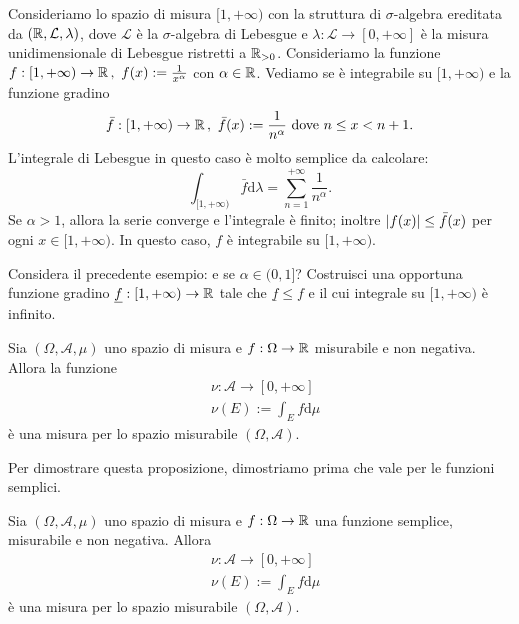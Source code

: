 \begin{esempio}
Consideriamo lo spazio di misura \([1, +\infty)\) con la struttura di \(\sigma\)-algebra ereditata da \((\mathbb R, \mathcal L, \lambda)\), dove \(\mathcal L\) è la \(\sigma\)-algebra di Lebesgue e \(\lambda : \mathcal L \to [0, +\infty]\) è la misura unidimensionale di Lebesgue ristretti a \(\mathbb R_{> 0}\). Consideriamo la funzione
\(f : [1, +\infty) \to \mathbb R \,,\ f(x) := \frac1{x^\alpha}\)
con \(\alpha \in \mathbb R\). Vediamo se è integrabile su \([1, +\infty)\) e la funzione gradino
\[\bar f : [1, +\infty) \to \mathbb R\,,\ \bar f(x) := \frac{1}{n^\alpha} \ \text{dove } n \le x < n+1 .\]
L'integrale di Lebesgue in questo caso è molto semplice da calcolare:
\[\int_{[1, +\infty)} \bar f \mathrm d \lambda = \sum_{n = 1}^{+\infty} \frac{1}{n^\alpha} .\]
Se \(\alpha > 1\), allora la serie converge e l'integrale è finito; inoltre \(\left\lvert f(x)\right\rvert\le \bar f(x)\) per ogni \(x \in [1, +\infty)\). In questo caso, \(f\) è integrabile su \([1, +\infty)\).
\end{esempio}

\begin{esercizio}
Considera il precedente esempio: e se \(\alpha \in (0, 1]\)? Costruisci una opportuna funzione gradino \(\underline f : [1, +\infty) \to \mathbb R\) tale che \(\underline f \le f\) e il cui integrale su \([1, +\infty)\) è infinito.
\end{esercizio}

\begin{proposizione}\label{proposizione:MisuraIntegrale}
Sia \((\Omega, \mathcal A, \mu)\) uno spazio di misura e \(f : \Omega \to \mathbb R\) misurabile e non negativa. Allora la funzione
\begin{align*}
& \nu : \mathcal A \to [0, +\infty] \\
& \nu(E) := \int_E f \mathrm d \mu
\end{align*}
è una misura per lo spazio misurabile \((\Omega, \mathcal A)\).
\end{proposizione}

Per dimostrare questa proposizione, dimostriamo prima che vale per le funzioni semplici.

\begin{lemma}
Sia \((\Omega, \mathcal A, \mu)\) uno spazio di misura e \(f : \Omega \to \mathbb R\) una funzione semplice, misurabile e non negativa. Allora
\begin{align*}
& \nu : \mathcal A \to [0, +\infty] \\
& \nu(E) := \int_E f \mathrm d \mu
\end{align*}
è una misura per lo spazio misurabile \((\Omega, \mathcal A)\).
\end{lemma}

